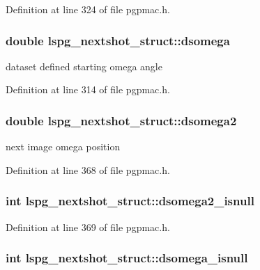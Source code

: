 Definition at line 324 of file pgpmac.\-h.

\hypertarget{structlspg__nextshot__struct_a4be525bb32fb0232c21a91529f1e8c73}{
\subsubsection[{dsomega}]{\setlength{\rightskip}{0pt plus 5cm}double lspg\-\_\-nextshot\-\_\-struct\-::dsomega}}\label{structlspg__nextshot__struct_a4be525bb32fb0232c21a91529f1e8c73}


dataset defined starting omega angle 



Definition at line 314 of file pgpmac.\-h.

\hypertarget{structlspg__nextshot__struct_a84ae35abfa725d1bdbff5403f6384ee4}{
\subsubsection[{dsomega2}]{\setlength{\rightskip}{0pt plus 5cm}double lspg\-\_\-nextshot\-\_\-struct\-::dsomega2}}\label{structlspg__nextshot__struct_a84ae35abfa725d1bdbff5403f6384ee4}


next image omega position 



Definition at line 368 of file pgpmac.\-h.

\hypertarget{structlspg__nextshot__struct_afaf9bdf89a68e7f479969072643e55eb}{
\subsubsection[{dsomega2\-\_\-isnull}]{\setlength{\rightskip}{0pt plus 5cm}int lspg\-\_\-nextshot\-\_\-struct\-::dsomega2\-\_\-isnull}}\label{structlspg__nextshot__struct_afaf9bdf89a68e7f479969072643e55eb}


Definition at line 369 of file pgpmac.\-h.

\hypertarget{structlspg__nextshot__struct_ad1da3548dc642d415aed53dc165c44fc}{
\subsubsection[{dsomega\-\_\-isnull}]{\setlength{\rightskip}{0pt plus 5cm}int lspg\-\_\-nextshot\-\_\-struct\-::dsomega\-\_\-isnull}}\label{structlspg__nextshot__struct_ad1da3548dc642d415aed53dc165c44fc}


